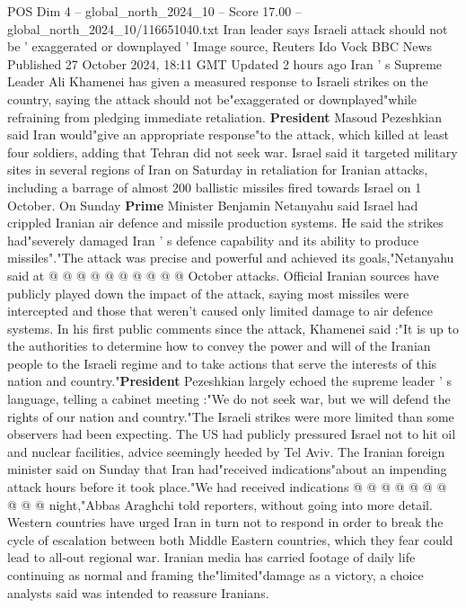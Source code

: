 \begin{textsample}{POS Dim 4 – global\_north\_2024\_10 – Score 17.00 – global\_north\_2024\_10/116651040.txt}  \label{ex:f4_pos_408}
Iran leader says Israeli attack should not be ' exaggerated or downplayed ' Image source, Reuters Ido Vock BBC News Published 27 October 2024, 18:11 GMT Updated 2 hours ago Iran ' s Supreme Leader Ali Khamenei has given a measured response to Israeli strikes on the country, saying the attack should not be"exaggerated or downplayed"while refraining from pledging immediate retaliation. \textbf{President} Masoud Pezeshkian said Iran would"give an appropriate response"to the attack, which killed at least four soldiers, adding that Tehran did not seek war.
Israel said it targeted military sites in several regions of Iran on Saturday in retaliation for Iranian attacks, including a barrage of almost 200 ballistic missiles fired towards Israel on 1 October.
On Sunday \textbf{Prime} Minister Benjamin Netanyahu said Israel had crippled Iranian air defence and missile production systems.
He said the strikes had"severely damaged Iran ' s defence capability and its ability to produce missiles"."The attack was precise and powerful and achieved its goals,"Netanyahu said at @ @ @ @ @ @ @ @ @ @ October attacks.
Official Iranian sources have publicly played down the impact of the attack, saying most missiles were intercepted and those that weren't caused only limited damage to air defence systems.
In his first public comments since the attack, Khamenei said :"It is up to the authorities to determine how to convey the power and will of the Iranian people to the Israeli regime and to take actions that serve the interests of this nation and country."\textbf{President} Pezeshkian largely echoed the supreme leader ' s language, telling a cabinet meeting :"We do not seek war, but we will defend the rights of our nation and country."The Israeli strikes were more limited than some observers had been expecting.
The US had publicly pressured Israel not to hit oil and nuclear facilities, advice seemingly heeded by Tel Aviv.
The Iranian foreign minister said on Sunday that Iran had"received indications"about an impending attack hours before it took place."We had received indications @ @ @ @ @ @ @ @ @ @ night,"Abbas Araghchi told reporters, without going into more detail.
Western countries have urged Iran in turn not to respond in order to break the cycle of escalation between both Middle Eastern countries, which they fear could lead to all-out regional war.
Iranian media has carried footage of daily life continuing as normal and framing the"limited"damage as a victory, a choice analysts said was intended to reassure Iranians.

\end{textsample}
